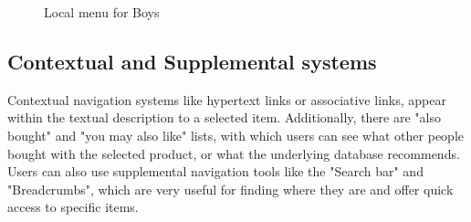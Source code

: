\begin{figure}[ht!]
  \centering
  \caption{Local menu for Boys}
  \label{fig:localMenu}
\end{figure}

\subsection{Contextual and Supplemental systems}
Contextual navigation systems like hypertext links or associative links, appear within the textual description to a selected item. Additionally, there are "also bought" and "you may also like" lists, with which users can see what other people bought with the selected product, or what the underlying database recommends. Users can also use supplemental navigation tools like the "Search bar" and "Breadcrumbs", which are very useful for finding where they are and offer quick access to specific items.


